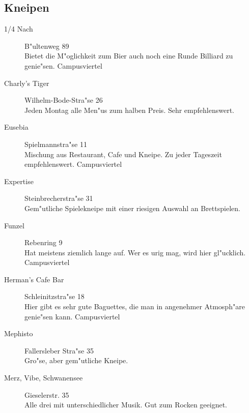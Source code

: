 \subsection{Kneipen}

\begin{description}

\item[1/4 Nach] \hfill B"ultenweg 89\\
Bietet die M"oglichkeit zum Bier auch noch eine Runde Billiard zu genie"sen.
Campusviertel\\


\item[Charly's Tiger] \hfill Wilhelm-Bode-Stra"se 26\\
Jeden Montag alle Men"us zum halben Preis. Sehr empfehlenswert.


\item[Eusebia] \hfill Spielmannstra"se 11\\
Mischung aus Restaurant, Cafe und Kneipe. Zu jeder Tageszeit empfehlenswert.
Campusviertel

\item[Expertise] \hfill Steinbrecherstra"se 31\\
Gem"utliche Spielekneipe mit einer riesigen Auswahl an Brettspielen.

\item[Funzel] \hfill Rebenring 9\\
Hat meistens ziemlich lange auf. Wer es urig mag, wird hier gl"ucklich.
Campusviertel

\item[Herman's Cafe Bar] \hfill Schleinitzstra"se 18\\
Hier gibt es sehr gute Baguettes, die man in angenehmer Atmosph"are genie"sen kann.
Campusviertel\\

\item[Mephisto] \hfill Fallersleber Stra"se 35\\
Gro"se, aber gem"utliche Kneipe.

\item[Merz, Vibe, Schwanensee] \hfill Gieselerstr. 35\\
Alle drei mit unterschiedlicher Musik. Gut zum Rocken geeignet.\\


\end{description}

